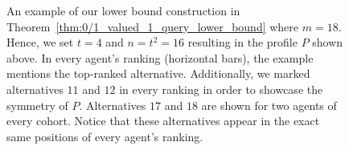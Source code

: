 \documentclass{article}
\begin{document}
\begin{figure}[h]
    
    \caption{An example of our lower bound construction in Theorem~\ref{thm:0/1_valued_1_query_lower_bound} where $m = 18$. Hence, we set $t=4$ and $n=t^2=16$ resulting in the profile $P$ shown above. In every agent's ranking (horizontal bars), the example mentions the top-ranked alternative. Additionally, we marked alternatives $11$ and $12$ in every ranking in order to showcase the symmetry of $P$. Alternatives $17$ and $18$ are shown for two agents of every cohort. Notice that these alternatives appear in the exact same positions of every agent's ranking.}
    \label{fig:lower_bound_example}
\end{figure}
\end{document}
